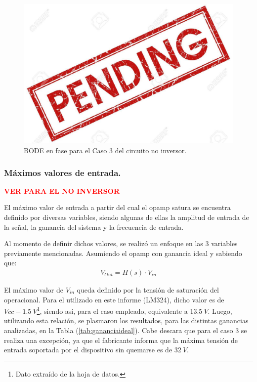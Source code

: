 \begin{figure}[H]	
	\centering
	\includegraphics[width=\textwidth]{ImagenesAux/pend.jpg}
	\caption{BODE en fase para el Caso 3 del circuito no inversor.}
	\label{fig:CompZinphC3}
\end{figure}

\subsubsection{Máximos valores de entrada.}

\begin{center}
\textcolor{red}{\textbf{VER PARA EL NO INVERSOR}}
\end{center}

El máximo valor de entrada a partir del cual el opamp satura se encuentra definido por diversas variables, siendo algunas de ellas la amplitud de entrada de la señal, la ganancia del sistema y la frecuencia de entrada.

Al momento de definir dichos valores, se realizó un enfoque en las 3 variables previamente mencionadas. Asumiendo el opamp con ganancia ideal y sabiendo que:
\begin{align} V_{Out}=H(s)\cdot V_{in}\end{align}

El máximo valor de $V_{in}$ queda definido por la tensión de saturación del operacional. Para el utilizado en este informe (LM324), dicho valor es de $Vcc - 1.5 \ V$\footnote{Dato extraído de la hoja de datos.}, siendo así, para el caso empleado, equivalente a $13.5 \ V$.
Luego, utilizando esta relación, se plasmaron los resultados, para las distintas ganancias analizadas, en la Tabla (\ref{tab:gananciaideal}). Cabe descara que para el caso 3 se realiza una excepción, ya que el fabricante informa que la máxima tensión de entrada soportada por el dispositivo sin quemarse es de $32 \ V$.

